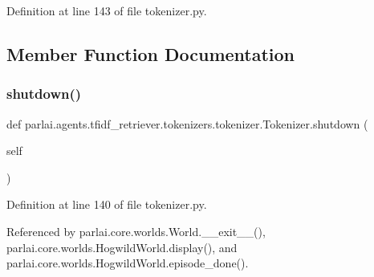 Definition at line 143 of file tokenizer.\+py.



\subsection{Member Function Documentation}
\mbox{\label{classparlai_1_1agents_1_1tfidf__retriever_1_1tokenizers_1_1tokenizer_1_1Tokenizer_a9c4af22e2a89737e6464bf031d16e32c}} 
\subsubsection{\texorpdfstring{shutdown()}{shutdown()}}
{\footnotesize\ttfamily def parlai.\+agents.\+tfidf\+\_\+retriever.\+tokenizers.\+tokenizer.\+Tokenizer.\+shutdown (\begin{DoxyParamCaption}\item[{}]{self }\end{DoxyParamCaption})}



Definition at line 140 of file tokenizer.\+py.



Referenced by parlai.\+core.\+worlds.\+World.\+\_\+\+\_\+exit\+\_\+\+\_\+(), parlai.\+core.\+worlds.\+Hogwild\+World.\+display(), and parlai.\+core.\+worlds.\+Hogwild\+World.\+episode\+\_\+done().

